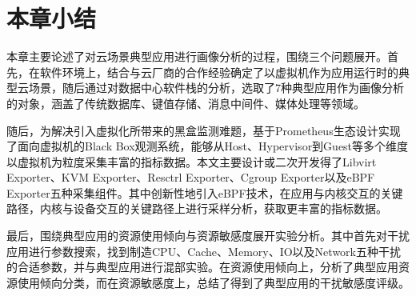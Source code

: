\section{本章小结}

本章主要论述了对云场景典型应用进行画像分析的过程，围绕三个问题展开。首先，在软件环境上，结合与云厂商的合作经验确定了以虚拟机作为应用运行时的典型云场景，随后通过对数据中心软件栈的分析，选取了7种典型应用作为画像分析的对象，涵盖了传统数据库、键值存储、消息中间件、媒体处理等领域。

随后，为解决引入虚拟化所带来的黑盒监测难题，基于Prometheus生态设计实现了面向虚拟机的Black Box观测系统，能够从Host、Hypervisor到Guest等多个维度以虚拟机为粒度采集丰富的指标数据。本文主要设计或二次开发得了Libvirt Exporter、KVM Exporter、Resctrl Exporter、Cgroup Exporter以及eBPF Exporter五种采集组件。其中创新性地引入eBPF技术，在应用与内核交互的关键路径，内核与设备交互的关键路径上进行采样分析，获取更丰富的指标数据。

最后，围绕典型应用的资源使用倾向与资源敏感度展开实验分析。其中首先对干扰应用进行参数搜索，找到制造CPU、Cache、Memory、IO以及Network五种干扰的合适参数，并与典型应用进行混部实验。在资源使用倾向上，分析了典型应用资源使用倾向分类，而在资源敏感度上，总结了得到了典型应用的干扰敏感度评级。